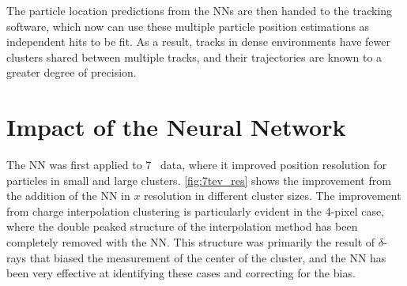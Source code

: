 The particle location predictions from the \acp{NN} are then handed to the tracking software, which now can use these multiple particle position estimations as independent hits to be fit. As a result, tracks in dense environments have fewer clusters shared between multiple tracks, and their trajectories are known to a greater degree of precision. 


\section{Impact of the Neural Network}

The \ac{NN} was first applied to 7 \tev~data, where it improved position resolution for particles in small and large clusters. \autoref{fig:7tev_res} shows the improvement from the addition of the \ac{NN} in $x$ resolution in different cluster sizes. The improvement from charge interpolation clustering is particularly evident in the 4-pixel case, where the double peaked structure of the interpolation method has been completely removed with the \ac{NN}. This structure was primarily the result of $\delta$-rays that biased the measurement of the center of the cluster, and the \ac{NN} has been very effective at identifying these cases and correcting for the bias. 

